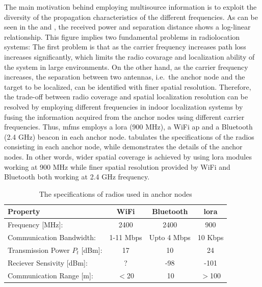     The main motivation behind employing multisource information is to exploit the diversity of the propagation characteristics of the different frequencies.
    As can be seen in the  and , the received power and separation distance shows a log-linear relationship.
    This figure implies two fundamental problems in radiolocation systems:
    The first problem is that as the carrier frequency increases path loss increases significantly, which limits the radio covarage and localization ability of the system in large environments.
    On the other hand, as the carrier frequency increases, the separation between two antennas, i.e.\ the anchor node and the target to be localized, can be identified with finer spatial resolution.
    Therefore, the trade-off between radio coverage and spatial localization resolution can be resolved by employing different frequencies in indoor localization systems by fusing the information acquired from the anchor nodes using different carrier frequencies.
    Thus, \gls{mfms} employs a \gls{lora} (900 MHz), a WiFi \gls{ap} and a Bluetooth (2.4 GHz) beacon in each anchor node.
     tabulates the specifications of the radios consisting in each anchor node, while  demonstrates the details of the anchor nodes.
    In other words, wider spatial coverage is achieved by using \gls{lora} modules working at 900 MHz while finer spatial resolution provided by WiFi and Bluetooth both working at 2.4 GHz frequency.

    \begin{table}
    \begin{center}
    \caption{\label{tab:specs}The specifications of radios used in anchor nodes}
      \begin{tabular}{@{}lccc@{}}\toprule[1.5pt]
        Property                        &WiFi           &Bluetooth      &\gls{lora}\\ \midrule[1.5pt]
        Frequency [MHz]:                &2400           &2400           &900 \\ \midrule
        Communication Bandwidth:        &1-11 Mbps      &Upto 4 Mbps    &10 Kbps \\ \midrule
        Transmission Power $P_t$ [dBm]: &17             &10             &24 \\ \midrule
        Reciever Sensivity [dBm]:       &?              &-98            &-101 \\ \midrule
        Communication Range [m]:        &$<$20          &$~$10            &$>$100  \\\bottomrule[1.5pt]
      \end{tabular}
    \end{center}
    \end{table}

